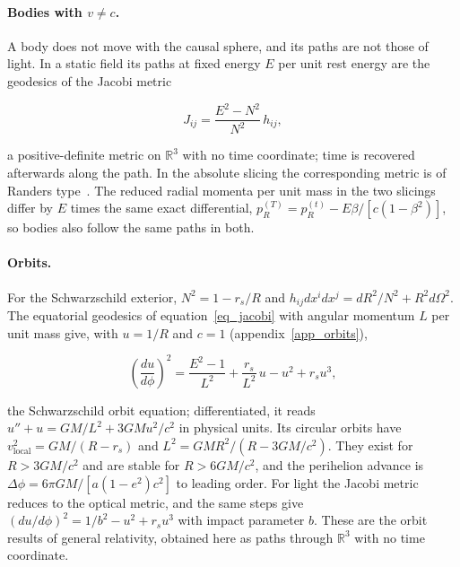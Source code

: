\documentclass[anonymous]{iopjournal}
\begin{document}
\paragraph{Bodies with $v\neq c$.} A body does not move with the causal sphere, and its paths are not those of light. In a static field its paths at fixed energy $E$ per unit rest energy are the geodesics of the Jacobi metric~\cite{Gibbons2016Jacobi}

\begin{equation}\label{eq_jacobi}
    J_{ij}=\frac{E^2-N^2}{N^2}\,h_{ij},
\end{equation}

a positive-definite metric on $\mathbb{R}^3$ with no time coordinate; time is recovered afterwards along the path. In the absolute slicing the corresponding metric is of Randers type~\cite{Chanda2019Jacobi}. The reduced radial momenta per unit mass in the two slicings differ by $E$ times the same exact differential, $p_R^{(T)}=p_R^{(t)}-E\beta/[c(1-\beta^2)]$, so bodies also follow the same paths in both.

\paragraph{Orbits.} For the Schwarzschild exterior, $N^2=1-r_s/R$ and $h_{ij}dx^idx^j=dR^2/N^2+R^2d\Omega^2$. The equatorial geodesics of equation~\eqref{eq_jacobi} with angular momentum $L$ per unit mass give, with $u=1/R$ and $c=1$ (appendix~\ref{app_orbits}),

\begin{equation}\label{eq_jacobi_orbit}
    \left(\frac{du}{d\phi}\right)^2=\frac{E^2-1}{L^2}+\frac{r_s}{L^2}\,u-u^2+r_s u^3 ,
\end{equation}

the Schwarzschild orbit equation; differentiated, it reads $u''+u=GM/L^2+3GMu^2/c^2$ in physical units. Its circular orbits have $v_{\mathrm{local}}^2=GM/(R-r_s)$ and $L^2=GMR^2/(R-3GM/c^2)$. They exist for $R>3GM/c^2$ and are stable for $R>6GM/c^2$, and the perihelion advance is $\Delta\phi=6\pi GM/[a(1-e^2)c^2]$ to leading order. For light the Jacobi metric reduces to the optical metric, and the same steps give $(du/d\phi)^2=1/b^2-u^2+r_su^3$ with impact parameter $b$. These are the orbit results of general relativity, obtained here as paths through $\mathbb{R}^3$ with no time coordinate.
\end{document}
